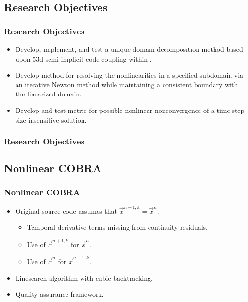 \documentclass[compress,xcolor=table]{beamer}
\begin{document}
\subsection[Research Objectives]{Research Objectives}
\begin{frame}
\frametitle{Research Objectives}

\begin{itemize}
\item{Develop, implement, and test a unique domain decomposition method based upon \relap53d{} semi-implicit code coupling within \cobra{}.}
\item{Develop method for resolving the nonlinearities in a specified subdomain via an iterative Newton method while maintaining a consistent boundary with the linearized domain.}
\item{Develop and test metric for possible nonlinear nonconvergence of a time-step size insensitive solution.}
\end{itemize}

\end{frame}
\begin{frame}
\frametitle{Research Objectives}

\begin{figure}[t]
\centering
\resizebox{!}{0.7\textheight}{

}
\end{figure}

\end{frame}
\subsection[COBRA]{Nonlinear COBRA}
\begin{frame}
\frametitle{Nonlinear COBRA}

\begin{itemize}
\item{Original source code assumes that $\vec{x}^{n+1,k} = \vec{x}^{n}$.
    \begin{itemize}
    \item{Temporal derivative terms missing from continuity residuals.}
    \item{Use of $\vec{x}^{n+1,k}$ for $\vec{x}^{n}$.}
    \item{Use of $\vec{x}^{n}$ for $\vec{x}^{n+1,k}$.}
    \end{itemize}
}
\item{Linesearch algorithm with cubic backtracking.}
\item{Quality assurance framework.}
\end{itemize}

\end{frame}
\end{document}

